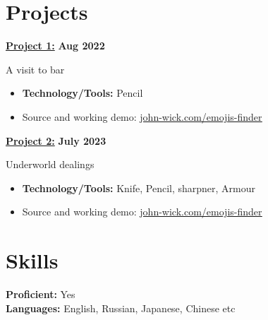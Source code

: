 \documentclass[letterpaper, 11pt]{article}
\newcommand{\bulletSpace}{\vspace{-8pt}}
\newcommand{\secStartSpace}{\vspace{3pt}}
\newcommand{\secEndSpace}{\vspace{5pt}}
\newcommand{\spaceCollapse}{\vspace{-5pt}}
\begin{document}
\section{\color{red} \textbf{Projects}}
\secStartSpace

\begin{addmargin}[1em]{1em}
		
	\noindent\href{https://github.com/john-wick}{\textbf{Project 1:}}  \hfill \textbf{Aug 2022} 
		
	\noindent A visit to bar
	\spaceCollapse
	\begin{itemize}
		\item \textbf{Technology/Tools:} Pencil
		      \bulletSpace
		\item Source and working demo:  \href{https://github.com/john-wick}{\underline{john-wick.com/emojis-finder}}
	\end{itemize}
	
	\noindent\href{https://github.com/john-wick}{\textbf{Project 2:}}  \hfill \textbf{July 2023} 
		
	\noindent Underworld dealings
	\spaceCollapse
	\begin{itemize}
		\item \textbf{Technology/Tools:} Knife, Pencil, sharpner, Armour
		      \bulletSpace
		\item Source and working demo:  \href{https://github.com/john-wick}{\underline{john-wick.com/emojis-finder}}
	\end{itemize}
		
		
\end{addmargin}
\secEndSpace


\section{\color{red} \textbf{Skills}}
\secStartSpace

\begin{addmargin}[1em]{1em}
	\noindent \textbf{Proficient:} Yes \\
	\noindent \textbf{Languages:} English, Russian, Japanese, Chinese etc \\
\end{addmargin}
\secEndSpace
\end{document}
